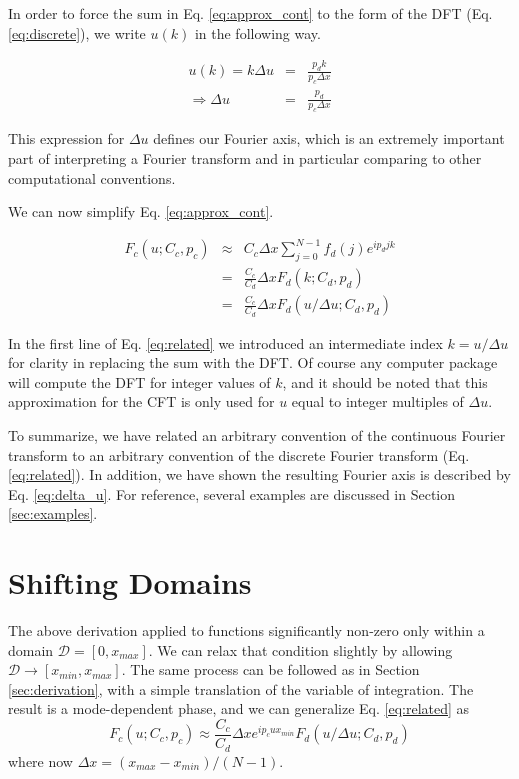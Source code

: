 \documentclass{article}
\begin{document}
In order to force the sum in Eq. \eqref{eq:approx_cont} to the form of the DFT (Eq. \eqref{eq:discrete}), we write $u(k)$ in the following way.

\begin{eqnarray}
\label{eq:delta_u}
u(k) = k\Delta u	&	= & \frac{p_d k}{p_c \Delta x} \nonumber \\
		\Rightarrow	\Delta u	&	=	&	\frac{p_d}{p_c \Delta x} 
\end{eqnarray}

This expression for $\Delta u$ defines our Fourier axis, which is an extremely important part of interpreting a Fourier transform and in particular comparing to other computational conventions.

We can now simplify Eq. \ref{eq:approx_cont}.  

\begin{eqnarray}
\label{eq:related}
F_c(u;C_c,p_c)	&	\approx	&	C_c \Delta x \sum\limits_{j=0}^{N-1}f_d(j)e^{i p_d j k} \nonumber \\
								&	=				&	\frac{C_c}{C_d} \Delta x F_d(k;C_d,p_d) \nonumber \\
								&	=				&	\frac{C_c}{C_d} \Delta x F_d(u / \Delta u;C_d,p_d)
\end{eqnarray}

In the first line of Eq. \ref{eq:related} we introduced an intermediate index $k=u/\Delta u$ for clarity in replacing the sum with the DFT.  Of course any computer package will compute the DFT for integer values of $k$, and it should be noted that this approximation for the CFT is only used for $u$ equal to integer multiples of $\Delta u$.

To summarize, we have related an arbitrary convention of the continuous Fourier transform to an arbitrary convention of the discrete Fourier transform (Eq. \ref{eq:related}).  In addition, we have shown the resulting Fourier axis is described by Eq. \ref{eq:delta_u}.  For reference, several examples are discussed in Section \ref{sec:examples}.

\section{Shifting Domains}\label{sec:shifting}

The above derivation applied to functions significantly non-zero only within a domain $\mathcal{D}=[0,x_{max}]$.  We can relax that condition slightly by allowing $\mathcal{D}\rightarrow[x_{min},x_{max}]$.  The same process can be followed as in Section \ref{sec:derivation}, with a simple translation of the variable of integration.  The result is a mode-dependent phase, and we can generalize Eq. \ref{eq:related} as
\begin{equation}
\label{eq:related_general}
F_c(u;C_c,p_c) \approx \frac{C_c}{C_d} \Delta x e^{i p_c u x_{min}}F_d(u / \Delta u;C_d,p_d)
\end{equation}
where now $\Delta x = (x_{max}-x_{min})/(N-1)$.
\end{document}
